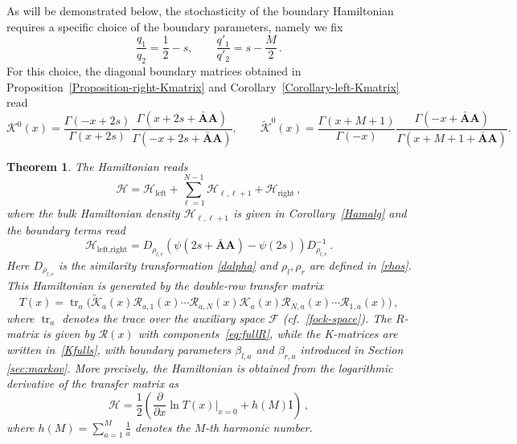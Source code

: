 \documentclass[11pt]{article}
\numberwithin{equation}{section}
\newtheorem{theorem}{Theorem}[section]
\newcommand{\OF}{\mathbf{A}}
\newcommand{\OFD}{\mathbf{\bar{A}}}
\newcommand{\M}{M}
\newcommand{\N}{N}
\newcommand{\ID}{\mathrm{I}}
\newcommand{\eR}{\mathcal{R}}
\newcommand{\eH}{\mathcal{H}}
\newcommand{\Khat}{\mathcal{K}^{0}}
\newcommand{\K}{\widetilde{\mathcal{K}}^{0}}
\newcommand{\KhatFull}{\mathcal{K}}
\newcommand{\Kfull}{\widetilde{\mathcal{K}}}
\DeclareMathOperator{\tr}{\text{tr}}
\begin{document}
As will be demonstrated below, the stochasticity of the boundary Hamiltonian requires a specific choice of the boundary parameters, namely we fix
\begin{equation}\label{paramter-choice_K}
\frac{q_{1}}{q_{2}}=\frac{1}{2}-s, 
\qquad 
\frac{q'_{1}}{q'_{2}}=s-\frac{\M}{2}\,.
\end{equation}
For this choice, the diagonal boundary matrices obtained in Proposition~\ref{Proposition-right-Kmatrix} and Corollary~\ref{Corollary-left-Kmatrix} read
\begin{equation}\label{Stochastic-Diagonal-Kmatrices}
\Khat(x)= 
\frac{\Gamma(-x+2s)}{\Gamma(x+2s)}
\frac{\Gamma(x+2s+\OFD\OF)}{\Gamma(-x+2s+\OFD\OF)},
\qquad 
\K(x)=
\frac{\Gamma(x+\M+1)}{\Gamma(-x)}
\frac{\Gamma(-x+\OFD\OF)}{\Gamma(x+\M+1+\OFD\OF)}.
\end{equation}















\begin{theorem}\label{Thm-transfer-Ham}
The Hamiltonian reads
\begin{equation}
  \eH = \mathcal{H}_\text{left} + \sum_{\ell=1}^{\N-1}\mathcal{H}_{\ell,\ell+1} + \mathcal{H}_\text{right}\,,
\end{equation}
where the bulk Hamiltonian density $\mathcal{H}_{\ell,\ell+1}$ is given in Corollary~\ref{Hamalg} and the boundary terms read
\begin{equation}\label{right-left-BD-hamiltonian}
 \mathcal{H}_{\text{left},\text{right}} = D_{\rho_{l,r}}\left(\psi(2s+\OFD\OF)-\psi(2s)\right)D_{\rho_{l,r}}^{-1}\,.
\end{equation}
Here $D_{\rho_{l,r}}$ is the similarity transformation \eqref{dalpha} and $\rho_{l},\rho_{r}$ are defined in \eqref{rhos}. This Hamiltonian is generated by the double-row transfer matrix
\begin{equation}
T(x)=\tr_{a}\Big(\Kfull_{a}(x)\eR_{a,1}(x)\cdots \eR_{a,N}(x)\KhatFull_{a}(x)\eR_{N,a}(x)\cdots \eR_{1,a}(x)\Big)\,,
\end{equation}
where $\tr_{a}$ denotes the trace over the auxiliary space $\mathcal{F}$ (cf.~\eqref{fock-space}). The $R$-matrix is given by $\eR(x)$ with components~\eqref{eq:fullR}, while the K-matrices are written in~\eqref{Kfulls}, 
with boundary parameters $\beta_{l,a}$ and $\beta_{r,a}$ introduced in Section \ref{sec:markov}. 
More precisely, the Hamiltonian is obtained from the logarithmic derivative of the transfer matrix as
\begin{equation}
 \eH = \frac{1}{2}\left(\frac{\partial}{\partial x}\ln T(x)\bigg|_{x=0} + h(\M)\ID \right)\,,
\end{equation}
where $h(\M)=\sum_{a=1}^{\M}\frac{1}{a}$ denotes the $\M$-th harmonic number.
\end{theorem}
\end{document}
